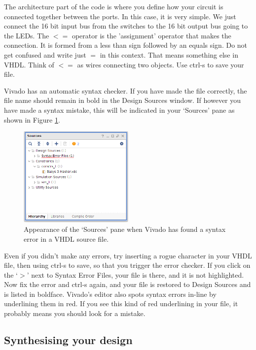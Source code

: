 \documentclass[../physical_computing.tex]{subfiles}
\begin{document}
The architecture part of the code is where you define how your circuit is connected together between the ports. In this case, it is very simple. We just connect the 16 bit input bus from the switches to the 16 bit output bus going to the LEDs. The $<=$ operator is the 'assignment' operator that makes the connection. It is formed from a less than sign followed by an equals sign. Do not get confused and write just $=$ in this context. That means something else in VHDL. Think of $<=$ as wires connecting two objects. Use ctrl-s to save your file.

Vivado has an automatic syntax checker. If you have made the file correctly, the file name should remain in bold in the Design Sources window. If however you have made a syntax mistake, this will be indicated in your `Sources' pane as shown in Figure \ref{fig:syntaxerror}.

\begin{figure}[htbp]
    \centering
    \includegraphics[width=0.5\textwidth]{chapter_1/figures/syntax_error.png}
    \caption{Appearance of the `Sources' pane when Vivado has found a syntax error in a VHDL source file.}
    \label{fig:syntaxerror}
\end{figure}

Even if you didn't make any errors, try inserting a rogue character in your VHDL file, then using ctrl-s to save, so that you trigger the error checker. If you click on the `$>$' next to Syntax Error Files, your file is there, and it is not highlighted. Now fix the error and ctrl-s again, and your file is restored to Design Sources and is listed in boldface. Vivado's editor also spots syntax errors in-line by underlining them in red. If you see this kind of red underlining in your file, it probably means you should look for a mistake.

\subsection{Synthesising your design}
\label{sec:synthesis}
\end{document}
